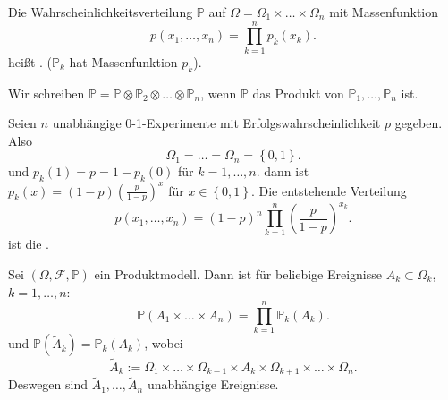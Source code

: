\begin{definition}[Produktmodell]\label{def:produktmodell}
    Die Wahrscheinlichkeitsverteilung $\mathbb{P}$ auf $\Omega = \Omega_1\times \ldots\times \Omega_n$ mit Massenfunktion
    \[
        p(x_1,\ldots,x_n) = \prod_{k=1}^n p_k(x_k)
    .\] 
    heißt . ($\mathbb{P}_k$ hat Massenfunktion $p_k$).
\end{definition}
\begin{notation}
    Wir schreiben $\mathbb{P} = \mathbb{P} \otimes \mathbb{P}_2 \otimes \ldots\otimes  \mathbb{P}_n$, wenn $\mathbb{P}$ das Produkt von $\mathbb{P}_1,\ldots,\mathbb{P}_n$ ist.
\end{notation}
\begin{example}
    Seien $n$ unabhängige  0-1-Experimente mit Erfolgswahrscheinlichkeit  $p$ gegeben. Also
     \[
    \Omega_1=\ldots=\Omega_n =\left \{0,1\right\} 
    .\] 
    und $p_k(1) = p = 1-p_k(0)$ für  $k=1,\ldots,n$. dann ist $p_k(x) = (1-p)\left( \frac{p}{1-p} \right) ^x$ für $x\in \left \{0,1\right\} $. Die entstehende Verteilung
    \[
        p(x_1,\ldots,x_n) = (1-p)^n \prod_{k=1}^n \left( \frac{p}{1-p} \right) ^{x_k}
    .\] 
    ist die .
\end{example}
\begin{theorem}
    Sei $(\Omega, \mathcal{F}, \mathbb{P})$ ein Produktmodell. Dann ist für beliebige Ereignisse $A_k \subset \Omega_k$, $k=1,\ldots,n$:
    \[
        \mathbb{P}(A_1\times \ldots\times A_n ) = \prod_{k=1}^n \mathbb{P}_k(A_k)
    .\] 
    und $\mathbb{P}(\tilde{A}_k) = \mathbb{P}_k(A_k)$, wobei
    \[
    \tilde{A}_k := \Omega_1\times \ldots\times \Omega_{k-1}\times A_k \times \Omega_{k+1} \times \ldots\times \Omega_n
    .\] 
    Deswegen sind $\tilde{A}_1,\ldots,\tilde{A}_n$ unabhängige Ereignisse.
\end{theorem}
